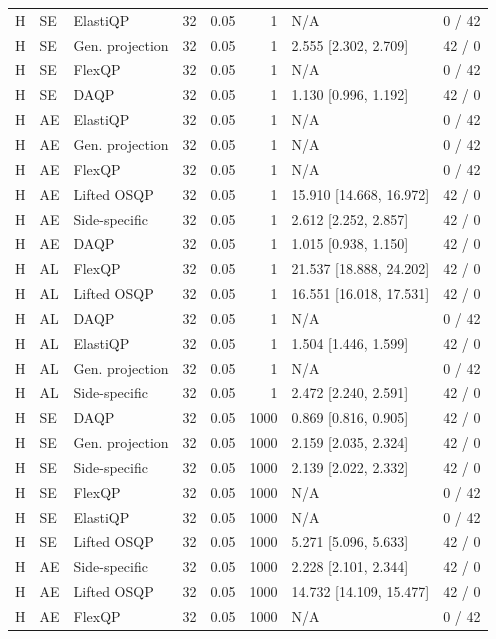 \begin{longtable}{@{}lllrrrlr@{}}
H & SE & ElastiQP & 32 & 0.05 & 1 & N/A & 0 / 42 \\
H & SE & Gen. projection & 32 & 0.05 & 1 & 2.555 [2.302, 2.709] & 42 / 0 \\
H & SE & FlexQP & 32 & 0.05 & 1 & N/A & 0 / 42 \\
H & SE & DAQP & 32 & 0.05 & 1 & 1.130 [0.996, 1.192] & 42 / 0 \\
H & AE & ElastiQP & 32 & 0.05 & 1 & N/A & 0 / 42 \\
H & AE & Gen. projection & 32 & 0.05 & 1 & N/A & 0 / 42 \\
H & AE & FlexQP & 32 & 0.05 & 1 & N/A & 0 / 42 \\
H & AE & Lifted OSQP & 32 & 0.05 & 1 & 15.910 [14.668, 16.972] & 42 / 0 \\
H & AE & Side-specific & 32 & 0.05 & 1 & 2.612 [2.252, 2.857] & 42 / 0 \\
H & AE & DAQP & 32 & 0.05 & 1 & 1.015 [0.938, 1.150] & 42 / 0 \\
H & AL & FlexQP & 32 & 0.05 & 1 & 21.537 [18.888, 24.202] & 42 / 0 \\
H & AL & Lifted OSQP & 32 & 0.05 & 1 & 16.551 [16.018, 17.531] & 42 / 0 \\
H & AL & DAQP & 32 & 0.05 & 1 & N/A & 0 / 42 \\
H & AL & ElastiQP & 32 & 0.05 & 1 & 1.504 [1.446, 1.599] & 42 / 0 \\
H & AL & Gen. projection & 32 & 0.05 & 1 & N/A & 0 / 42 \\
H & AL & Side-specific & 32 & 0.05 & 1 & 2.472 [2.240, 2.591] & 42 / 0 \\
H & SE & DAQP & 32 & 0.05 & 1000 & 0.869 [0.816, 0.905] & 42 / 0 \\
H & SE & Gen. projection & 32 & 0.05 & 1000 & 2.159 [2.035, 2.324] & 42 / 0 \\
H & SE & Side-specific & 32 & 0.05 & 1000 & 2.139 [2.022, 2.332] & 42 / 0 \\
H & SE & FlexQP & 32 & 0.05 & 1000 & N/A & 0 / 42 \\
H & SE & ElastiQP & 32 & 0.05 & 1000 & N/A & 0 / 42 \\
H & SE & Lifted OSQP & 32 & 0.05 & 1000 & 5.271 [5.096, 5.633] & 42 / 0 \\
H & AE & Side-specific & 32 & 0.05 & 1000 & 2.228 [2.101, 2.344] & 42 / 0 \\
H & AE & Lifted OSQP & 32 & 0.05 & 1000 & 14.732 [14.109, 15.477] & 42 / 0 \\
H & AE & FlexQP & 32 & 0.05 & 1000 & N/A & 0 / 42 \\

\end{longtable}
